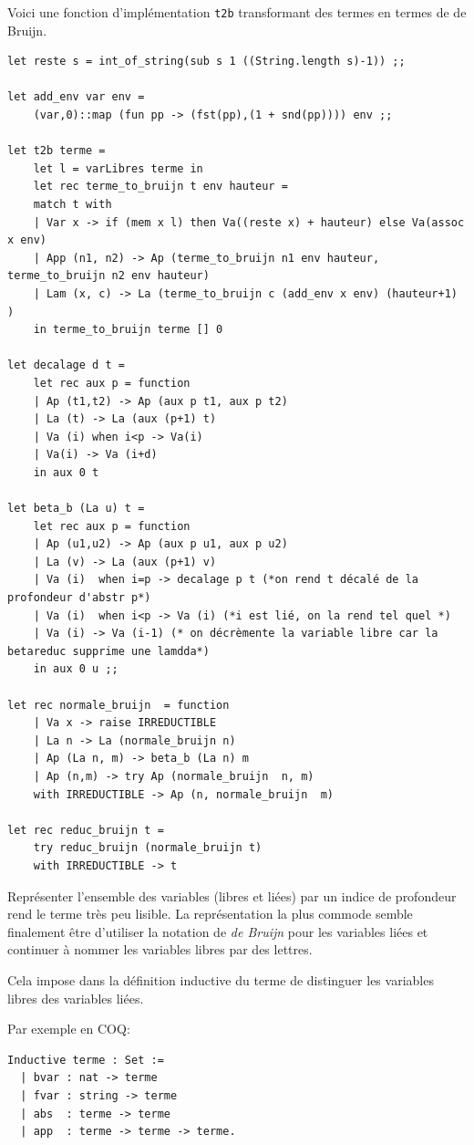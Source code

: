 \documentclass[11pt]{book}
\begin{document}
Voici une fonction d'implémentation \verb+t2b+ transformant des termes en termes de de Bruijn.
\begin{Verbatim}
let reste s = int_of_string(sub s 1 ((String.length s)-1)) ;;

let add_env var env =
	(var,0)::map (fun pp -> (fst(pp),(1 + snd(pp)))) env ;;

let t2b terme =
	let l = varLibres terme in
	let rec terme_to_bruijn t env hauteur =
	match t with
	| Var x -> if (mem x l) then Va((reste x) + hauteur) else Va(assoc x env)
	| App (n1, n2) -> Ap (terme_to_bruijn n1 env hauteur, terme_to_bruijn n2 env hauteur) 
	| Lam (x, c) -> La (terme_to_bruijn c (add_env x env) (hauteur+1) )
	in terme_to_bruijn terme [] 0

let decalage d t =
	let rec aux p = function
	| Ap (t1,t2) -> Ap (aux p t1, aux p t2) 
	| La (t) -> La (aux (p+1) t)
	| Va (i) when i<p -> Va(i)
	| Va(i) -> Va (i+d)
	in aux 0 t

let beta_b (La u) t =
	let rec aux p = function
	| Ap (u1,u2) -> Ap (aux p u1, aux p u2)
	| La (v) -> La (aux (p+1) v)
	| Va (i)  when i=p -> decalage p t (*on rend t décalé de la profondeur d'abstr p*)
	| Va (i)  when i<p -> Va (i) (*i est lié, on la rend tel quel *)
	| Va (i) -> Va (i-1) (* on décrèmente la variable libre car la betareduc supprime une lamdda*)
	in aux 0 u ;;

let rec normale_bruijn  = function
	| Va x -> raise IRREDUCTIBLE
	| La n -> La (normale_bruijn n)
	| Ap (La n, m) -> beta_b (La n) m
	| Ap (n,m) -> try Ap (normale_bruijn  n, m)
	with IRREDUCTIBLE -> Ap (n, normale_bruijn  m)

let rec reduc_bruijn t =
	try reduc_bruijn (normale_bruijn t)
	with IRREDUCTIBLE -> t 
\end{Verbatim}

Représenter l'ensemble des variables (libres et liées) par un indice de profondeur rend le terme très peu lisible.
La représentation la plus commode semble finalement être d'utiliser la notation de \textit{de Bruijn}  pour les variables liées
 et continuer
à nommer les variables libres par des lettres.

Cela impose dans la définition inductive du terme de distinguer les variables libres des variables liées.

Par exemple en COQ:
\begin{Verbatim}
Inductive terme : Set :=
  | bvar : nat -> terme
  | fvar : string -> terme
  | abs  : terme -> terme
  | app  : terme -> terme -> terme.
\end{Verbatim}
\end{document}
